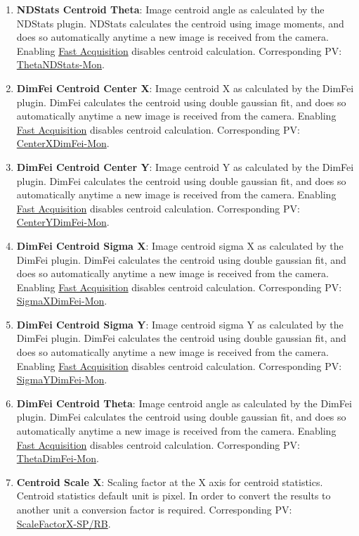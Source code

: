 \documentclass[openany]{article}
\begin{document}
\begin{enumerate}
            \item \textbf{NDStats Centroid Theta}: Image centroid angle as calculated by the NDStats plugin. NDStats calculates the centroid using image moments, and does so automatically anytime a new image is received from the camera. Enabling \hyperref[seq:fast-acq]{Fast Acquisition} disables centroid calculation. Corresponding PV: \hyperlink{pv:theta-ndstats}{ThetaNDStats-Mon}.
            \item \textbf{DimFei Centroid Center X}: Image centroid X as calculated by the DimFei plugin. DimFei calculates the centroid using double gaussian fit, and does so automatically anytime a new image is received from the camera. Enabling \hyperref[seq:fast-acq]{Fast Acquisition} disables centroid calculation. Corresponding PV: \hyperlink{pv:center-x-dimfei}{CenterXDimFei-Mon}.
            \item \textbf{DimFei Centroid Center Y}: Image centroid Y as calculated by the DimFei plugin. DimFei calculates the centroid using double gaussian fit, and does so automatically anytime a new image is received from the camera. Enabling \hyperref[seq:fast-acq]{Fast Acquisition} disables centroid calculation. Corresponding PV: \hyperlink{pv:center-y-dimfei}{CenterYDimFei-Mon}.
            \item \textbf{DimFei Centroid Sigma X}: Image centroid sigma X as calculated by the DimFei plugin. DimFei calculates the centroid using double gaussian fit, and does so automatically anytime a new image is received from the camera. Enabling \hyperref[seq:fast-acq]{Fast Acquisition} disables centroid calculation. Corresponding PV: \hyperlink{pv:sigma-x-dimfei}{SigmaXDimFei-Mon}.
            \item \textbf{DimFei Centroid Sigma Y}: Image centroid sigma Y as calculated by the DimFei plugin. DimFei calculates the centroid using double gaussian fit, and does so automatically anytime a new image is received from the camera. Enabling \hyperref[seq:fast-acq]{Fast Acquisition} disables centroid calculation. Corresponding PV: \hyperlink{pv:sigma-y-dimfei}{SigmaYDimFei-Mon}.
            \item \textbf{DimFei Centroid Theta}: Image centroid angle as calculated by the DimFei plugin. DimFei calculates the centroid using double gaussian fit, and does so automatically anytime a new image is received from the camera. Enabling \hyperref[seq:fast-acq]{Fast Acquisition} disables centroid calculation. Corresponding PV: \hyperlink{pv:theta-dimfei}{ThetaDimFei-Mon}.
            \item \textbf{Centroid Scale X}: Scaling factor at the X axis for centroid statistics. Centroid statistics default unit is pixel. In order to convert the results to another unit a conversion factor is required. Corresponding PV: \hyperlink{pv:scale-factor-x}{ScaleFactorX-SP/RB}.

\end{enumerate}
\end{document}
